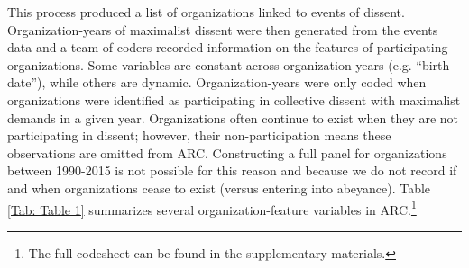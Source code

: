 This process produced a list of organizations linked to events of dissent. Organization-years of maximalist dissent were then generated from the events data and a team of coders recorded information on the features of participating organizations. Some variables are constant across organization-years (e.g. ``birth date''), while others are dynamic. Organization-years were only coded when organizations were identified as participating in collective dissent with maximalist demands in a given year. Organizations often continue to exist when they are not participating in dissent; however, their non-participation means these observations are omitted from ARC. Constructing a full panel for organizations between 1990-2015 is not possible for this reason and because we do not record if and when organizations cease to exist (versus entering into abeyance). Table \ref{Tab: Table 1} summarizes several organization-feature variables in ARC.\footnote{The full codesheet can be found in the supplementary materials.} 

\singlespacing

